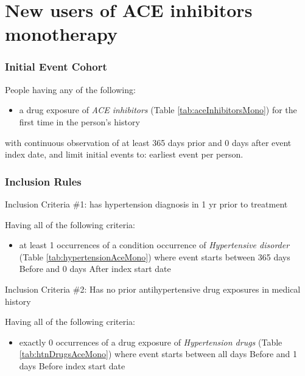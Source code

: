 \documentclass[11pt]{book}
\providecommand{\tightlist}{%
  \setlength{\itemsep}{0pt}\setlength{\parskip}{0pt}}
\theoremstyle{definition}
\theoremstyle{definition}
\theoremstyle{definition}
\theoremstyle{remark}
\begin{document}
\hypertarget{AceInhibitorsMono}{%
\section{New users of ACE inhibitors monotherapy}\label{AceInhibitorsMono}}

\hypertarget{initial-event-cohort-1}{%
\subsubsection*{Initial Event Cohort}\label{initial-event-cohort-1}}

People having any of the following:

\begin{itemize}
\tightlist
\item
  a drug exposure of \emph{ACE inhibitors} (Table \ref{tab:aceInhibitorsMono}) for the first time in the person's history
\end{itemize}

with continuous observation of at least 365 days prior and 0 days after event index date, and limit initial events to: earliest event per person.

\hypertarget{inclusion-rules}{%
\subsubsection*{Inclusion Rules}\label{inclusion-rules}}

Inclusion Criteria \#1: has hypertension diagnosis in 1 yr prior to treatment

Having all of the following criteria:

\begin{itemize}
\tightlist
\item
  at least 1 occurrences of a condition occurrence of \emph{Hypertensive disorder} (Table \ref{tab:hypertensionAceMono}) where event starts between 365 days Before and 0 days After index start date
\end{itemize}

Inclusion Criteria \#2: Has no prior antihypertensive drug exposures in medical history

Having all of the following criteria:

\begin{itemize}
\tightlist
\item
  exactly 0 occurrences of a drug exposure of \emph{Hypertension drugs} (Table \ref{tab:htnDrugsAceMono}) where event starts between all days Before and 1 days Before index start date
\end{itemize}
\end{document}
